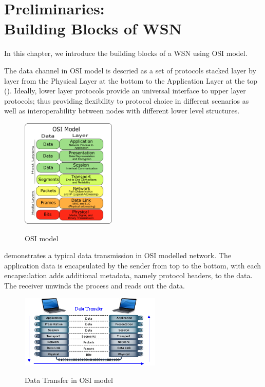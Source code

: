 \chapter{Preliminaries:\\ Building Blocks of WSN} \label{Chp: Building Blocks}

In this chapter, we introduce the building blocks of a WSN using OSI model\cite{OSI}.

The data channel in OSI model is descried as a set of protocols stacked layer by layer from the Physical Layer at the bottom to the Application Layer at the top (). Ideally, lower layer protocols provide an universal  interface to upper layer protocols; thus providing flexibility to protocol choice in different scenarios as well as interoperability between nodes with different lower level structures.

\begin{figure}[h!]
	\centering
	{
		\includegraphics[width=0.4\textwidth,]{fig/Osi-model-jb.png}
	}
	\caption{OSI model} \label{fig: OSI model}
\end{figure}

 demonstrates a typical data transmission in OSI modelled network. The application data is encapsulated by the sender from top to the bottom, with each encapsulation adds additional metadata, namely protocol headers, to the data. The receiver unwinds the process and reads out the data.

\begin{figure}[h!]
	\centering
	{
		\includegraphics[width=0.6\textwidth,]{fig/osi-model.png}
	}
	\caption{Data Transfer in OSI model} \label{fig: OSI channel}
\end{figure}

